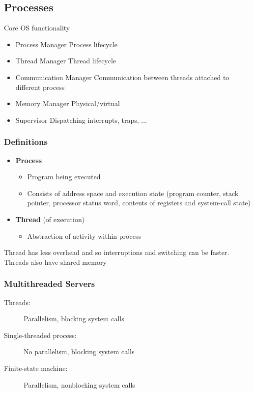 \subsection{Processes}
\begin{note}{Core OS functionality}
	\begin{itemize}
		\item Process Manager
		\subitem Process lifecycle
		\item Thread Manager
		\subitem Thread lifecycle
		\item Communication Manager
		\subitem Communication between threads attached to different process
		\item Memory Manager
		\subitem Physical/virtual
		\item Supervisor
		\subitem Dispatching interrupts, traps, ...	
	\end{itemize}
\end{note}

\subsubsection{Definitions}
\begin{itemize}
	\item\textbf{Process}
	\begin{itemize}
		\item Program being executed
		\item Consists of address space and execution state (program counter, stack pointer, processor status word, contents of registers and system-call state)
	\end{itemize}
	\item\textbf{Thread} (of execution)
	\begin{itemize}
		\item Abstraction of activity within process
	\end{itemize}
\end{itemize}
Thread has less overhead and so interruptions and switching can be faster. Threads also have shared memory

\subsubsection{Multithreaded Servers}
\begin{description}
	\item[Threads:] Parallelism, blocking system calls
	\item[Single-threaded process:] No parallelism, blocking system calls
	\item[Finite-state machine:] Parallelism, nonblocking system calls
\end{description}


